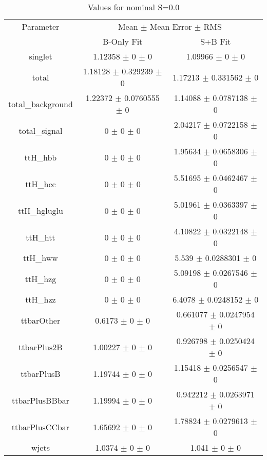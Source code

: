 \begin{table}
\centering
\caption{Values for nominal S=0.0}
\begin{tabular}{ccc}
\toprule
Parameter & \multicolumn{2}{c}{Mean $\pm$ Mean Error $\pm$ RMS}\\
 & B-Only Fit & S+B Fit\\
\midrule
singlet & \num{1.12358} $\pm$ \num{0} $\pm$ \num{0} & \num{1.09966} $\pm$ \num{0} $\pm$ \num{0}\\
total & \num{1.18128} $\pm$ \num{0.329239} $\pm$ \num{0} & \num{1.17213} $\pm$ \num{0.331562} $\pm$ \num{0}\\
total\_background & \num{1.22372} $\pm$ \num{0.0760555} $\pm$ \num{0} & \num{1.14088} $\pm$ \num{0.0787138} $\pm$ \num{0}\\
total\_signal & \num{0} $\pm$ \num{0} $\pm$ \num{0} & \num{2.04217} $\pm$ \num{0.0722158} $\pm$ \num{0}\\
ttH\_hbb & \num{0} $\pm$ \num{0} $\pm$ \num{0} & \num{1.95634} $\pm$ \num{0.0658306} $\pm$ \num{0}\\
ttH\_hcc & \num{0} $\pm$ \num{0} $\pm$ \num{0} & \num{5.51695} $\pm$ \num{0.0462467} $\pm$ \num{0}\\
ttH\_hgluglu & \num{0} $\pm$ \num{0} $\pm$ \num{0} & \num{5.01961} $\pm$ \num{0.0363397} $\pm$ \num{0}\\
ttH\_htt & \num{0} $\pm$ \num{0} $\pm$ \num{0} & \num{4.10822} $\pm$ \num{0.0322148} $\pm$ \num{0}\\
ttH\_hww & \num{0} $\pm$ \num{0} $\pm$ \num{0} & \num{5.539} $\pm$ \num{0.0288301} $\pm$ \num{0}\\
ttH\_hzg & \num{0} $\pm$ \num{0} $\pm$ \num{0} & \num{5.09198} $\pm$ \num{0.0267546} $\pm$ \num{0}\\
ttH\_hzz & \num{0} $\pm$ \num{0} $\pm$ \num{0} & \num{6.4078} $\pm$ \num{0.0248152} $\pm$ \num{0}\\
ttbarOther & \num{0.6173} $\pm$ \num{0} $\pm$ \num{0} & \num{0.661077} $\pm$ \num{0.0247954} $\pm$ \num{0}\\
ttbarPlus2B & \num{1.00227} $\pm$ \num{0} $\pm$ \num{0} & \num{0.926798} $\pm$ \num{0.0250424} $\pm$ \num{0}\\
ttbarPlusB & \num{1.19744} $\pm$ \num{0} $\pm$ \num{0} & \num{1.15418} $\pm$ \num{0.0256547} $\pm$ \num{0}\\
ttbarPlusBBbar & \num{1.19994} $\pm$ \num{0} $\pm$ \num{0} & \num{0.942212} $\pm$ \num{0.0263971} $\pm$ \num{0}\\
ttbarPlusCCbar & \num{1.65692} $\pm$ \num{0} $\pm$ \num{0} & \num{1.78824} $\pm$ \num{0.0279613} $\pm$ \num{0}\\
wjets & \num{1.0374} $\pm$ \num{0} $\pm$ \num{0} & \num{1.041} $\pm$ \num{0} $\pm$ \num{0}\\
\bottomrule
\end{tabular}
\end{table}